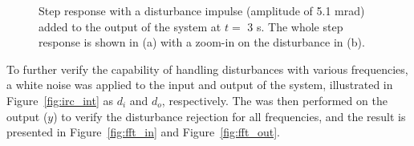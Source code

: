 \begin{figure}[h!]
  \centering %
  \qquad
  \caption{\label{fig:irc_dist_output} Step response with a disturbance impulse (amplitude of 5.1 mrad) added to the output of the system at $t=$ 3 s. The whole step response is shown in (a) with a zoom-in on the disturbance in (b).}
\end{figure}
\FloatBarrier
To further verify the capability of handling disturbances with various frequencies, a white noise was applied to the input and output of the system, illustrated in Figure~\ref{fig:irc_int} as $d_i$ and $d_o$, respectively. The \abbrFFT was then performed on the output ($y$) to verify the disturbance rejection for all frequencies, and the result is presented in Figure~\ref{fig:fft_in} and Figure~\ref{fig:fft_out}.

